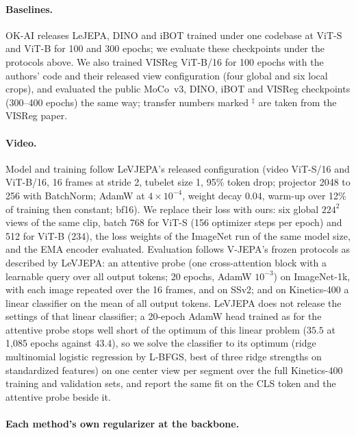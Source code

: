 \paragraph{Baselines.}
OK-AI releases LeJEPA, DINO and iBOT trained under one codebase at ViT-S and ViT-B for 100 and 300 epochs; we evaluate these checkpoints under the protocols above. We also trained VISReg ViT-B/16 for 100 epochs with the authors' code and their released view configuration (four global and six local crops), and evaluated the public MoCo~v3, DINO, iBOT and VISReg checkpoints (300--400 epochs) the same way; transfer numbers marked $^\ddag$ are taken from the VISReg paper. %

\paragraph{Video.}
Model and training follow LeVJEPA's released configuration (video ViT-S/16 and ViT-B/16, 16 frames at stride 2, tubelet size 1, 95\% token drop; projector 2048 to 256 with BatchNorm; AdamW at $4\times10^{-4}$, weight decay $0.04$, warm-up over 12\% of training then constant; bf16). We replace their loss with ours: six global $224^2$ views of the same clip, batch 768 for ViT-S (156 optimizer steps per epoch) and 512 for ViT-B (234), the loss weights of the ImageNet run of the same model size, and the EMA encoder evaluated. Evaluation follows V-JEPA's frozen protocols as described by LeVJEPA: an attentive probe (one cross-attention block with a learnable query over all output tokens; 20 epochs, AdamW $10^{-3}$) on ImageNet-1k, with each image repeated over the 16 frames, and on SSv2; and on Kinetics-400 a linear classifier on the mean of all output tokens. LeVJEPA does not release the settings of that linear classifier; a 20-epoch AdamW head trained as for the attentive probe stops well short of the optimum of this linear problem ($35.5$ at 1{,}085 epochs against $43.4$), so we solve the classifier to its optimum (ridge multinomial logistic regression by L-BFGS, best of three ridge strengths on standardized features) on one center view per segment over the full Kinetics-400 training and validation sets, and report the same fit on the CLS token and the attentive probe beside it.

\paragraph{Each method's own regularizer at the backbone.}

